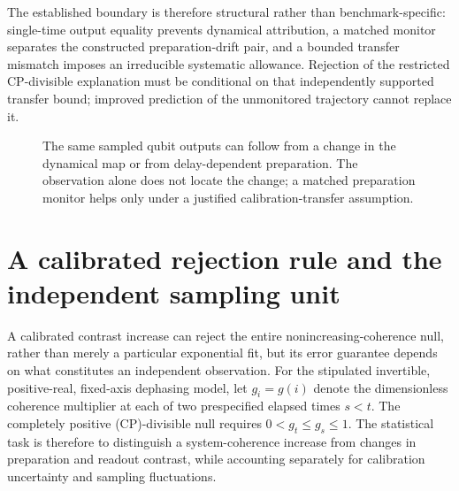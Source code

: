 \documentclass[11pt]{article}
\begin{document}
The established boundary is therefore structural rather than benchmark-specific: single-time output equality prevents dynamical attribution, a matched monitor separates the constructed preparation-drift pair, and a bounded transfer mismatch imposes an irreducible systematic allowance. Rejection of the restricted CP-divisible explanation must be conditional on that independently supported transfer bound; improved prediction of the unmonitored trajectory cannot replace it.

\begin{figure}[!htbp]
\centering
{}
\caption{The same sampled qubit outputs can follow from a change in the dynamical map or from delay-dependent preparation. The observation alone does not locate the change; a matched preparation monitor helps only under a justified calibration-transfer assumption.}
\par{}
\end{figure}
\section{A calibrated rejection rule and the independent sampling unit}
A calibrated contrast increase can reject the entire nonincreasing-coherence null, rather than merely a particular exponential fit, but its error guarantee depends on what constitutes an independent observation. For the stipulated invertible, positive-real, fixed-axis dephasing model, let $g_i=g(i)$ denote the dimensionless coherence multiplier at each of two prespecified elapsed times $s<t$. The completely positive (CP)-divisible null requires $0<g_t\leq g_s\leq1$. The statistical task is therefore to distinguish a system-coherence increase from changes in preparation and readout contrast, while accounting separately for calibration uncertainty and sampling fluctuations.
\end{document}
